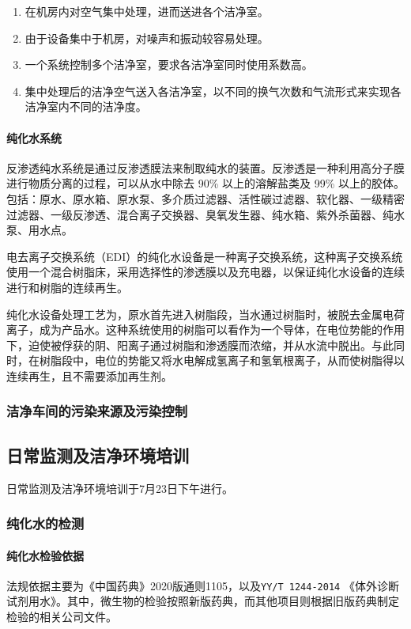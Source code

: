 \documentclass[cn,black,12pt,normal]{elegantnote}
\begin{document}
\begin{enumerate}
    \item 在机房内对空气集中处理，进而送进各个洁净室。
    \item 由于设备集中于机房，对噪声和振动较容易处理。
    \item 一个系统控制多个洁净室，要求各洁净室同时使用系数高。
    \item 集中处理后的洁净空气送入各洁净室，以不同的换气次数和气流形式来实现各洁净室内不同的洁净度。
\end{enumerate}

\paragraph{纯化水系统} 反渗透纯水系统是通过反渗透膜法来制取纯水的装置。反渗透是一种利用高分子膜进行物质分离的过程，可以从水中除去 90\% 以上的溶解盐类及 99\% 以上的胶体。
包括：原水、原水箱、原水泵、多介质过滤器、活性碳过滤器、软化器、一级精密过滤器、一级反渗透、混合离子交换器、臭氧发生器、纯水箱、紫外杀菌器、纯水泵、用水点。

电去离子交换系统（EDI）的纯化水设备是一种离子交换系统，这种离子交换系统使用一个混合树脂床，采用选择性的渗透膜以及充电器，以保证纯化水设备的连续进行和树脂的连续再生。

纯化水设备处理工艺为，原水首先进入树脂段，当水通过树脂时，被脱去金属电荷离子，成为产品水。这种系统使用的树脂可以看作为一个导体，在电位势能的作用下，迫使被俘获的阴、阳离子通过树脂和渗透膜而浓缩，并从水流中脱出。与此同时，在树脂段中，电位的势能又将水电解成氢离子和氢氧根离子，从而使树脂得以连续再生，且不需要添加再生剂。


\subsubsection{洁净车间的污染来源及污染控制}



\subsection{日常监测及洁净环境培训}
日常监测及洁净环境培训于7月23日下午进行。

\subsubsection{纯化水的检测}
\paragraph{纯化水检验依据} 法规依据主要为《中国药典》2020版通则1105，以及\texttt{YY/T 1244-2014} 《体外诊断试剂用水》。其中，微生物的检验按照新版药典，而其他项目则根据旧版药典制定检验的相关公司文件。
\end{document}
